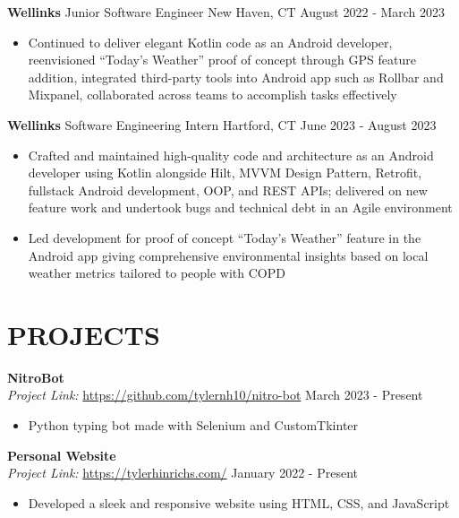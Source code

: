 \documentclass[a4paper,10pt]{extarticle}
\begin{document}
\noindent
\textbf{Wellinks} \textbar \space Junior Software Engineer \hfill New Haven, CT \textbar \space August 2022 - March 2023 %
\begin{itemize}
    \item Continued to deliver elegant Kotlin code as an Android developer, reenvisioned “Today’s Weather” proof of concept through GPS feature addition, integrated third-party tools into Android app such as Rollbar and Mixpanel, collaborated across teams to accomplish tasks effectively %
\end{itemize}

\noindent
\textbf{Wellinks} \textbar \space Software Engineering Intern \hfill Hartford, CT \textbar \space June 2023 - August 2023 %
\begin{itemize}
    \item Crafted and maintained high-quality code and architecture as an Android developer using Kotlin alongside Hilt, MVVM Design Pattern, Retrofit, fullstack Android development, OOP, and REST APIs; delivered on new feature work and undertook bugs and technical debt in an Agile environment %
    \item Led development for proof of concept “Today’s Weather” feature in the Android app giving comprehensive environmental insights based on local weather metrics tailored to people with COPD

\end{itemize}

\section*{PROJECTS}
\noindent
\textbf{NitroBot}\\ %
\textit{Project Link:} \url{https://github.com/tylernh10/nitro-bot} \hfill March 2023 - Present %
\begin{itemize}[topsep=3pt]
    \item Python typing bot made with Selenium and CustomTkinter %
\end{itemize}

\noindent
\textbf{Personal Website}\\ %
\textit{Project Link:} \url{https://tylerhinrichs.com/} \hfill January 2022 - Present %
\begin{itemize}[topsep=3pt]
    \item Developed a sleek and responsive website using HTML, CSS, and JavaScript %
\end{itemize}
\end{document}
